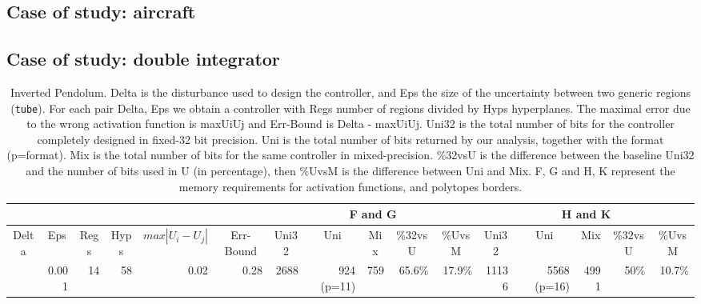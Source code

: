 \subsection{Case of study: aircraft}
\subsection{Case of study: double integrator}

\begin{landscape}
	\pagestyle{empty}
\begin{table}[p]
	\centering
	\caption{Inverted Pendolum. Delta is the disturbance used to design the controller, and Eps the size of the uncertainty between two generic regions (\texttt{tube}). For each pair Delta, Eps we obtain a controller with Regs number of regions divided by Hyps hyperplanes. The maximal error due to the wrong activation function is maxUiUj and Err-Bound is Delta - maxUiUj. Uni32 is the total number of bits for the controller completely designed in fixed-32 bit precision. Uni is the total number of bits returned by our analysis, together with the format (p=format). Mix is the total number of bits for the same controller in mixed-precision. \%32vsU is the difference between the baseline Uni32 and the number of bits used in U (in percentage), then \%UvsM is the difference between Uni and Mix. F, G and H, K represent the memory requirements for activation functions, and polytopes borders.  
	}
	\label{tab:ipd}
	\begin{tabular}{rrrrrrrrrrrrrrrr}
		\cline{7-11}
		\cline{12-16}
		\multicolumn{4}{c}{} &
		\multicolumn{2}{c}{} &
		\multicolumn{5}{c|}{F and G} &
		\multicolumn{5}{c}{H and K} \\
		\hline
		\multicolumn{1}{c}{Delta}&
		\multicolumn{1}{c}{Eps} &
		\multicolumn{1}{c}{Regs} &
		\multicolumn{1}{c}{Hyps} &
		\multicolumn{1}{c}{$max|U_{i}-U_{j}|$} &
		\multicolumn{1}{c}{Err-Bound} &
		\multicolumn{1}{c}{Uni32}&
		\multicolumn{1}{c}{Uni}&
		\multicolumn{1}{c}{Mix}&
		\multicolumn{1}{c}{\%32vsU}&
		\multicolumn{1}{c}{\%UvsM}&
		\multicolumn{1}{c}{Uni32}&
		\multicolumn{1}{c}{Uni}&
		\multicolumn{1}{c}{Mix}&
		\multicolumn{1}{c}{\%32vsU}&
		\multicolumn{1}{c}{\%UvsM} \\
		\hline
		
		\color{red}{0.30} & 0.001 & 14 & 58 & 0.02 & 0.28 & 2688 & 924 (p=11) & 759 & 65.6\% & 17.9\% & 11136 & 5568 (p=16) & 4991 & 50\% & 10.7\% \\
		

\end{tabular}
\end{table}
\end{landscape}
